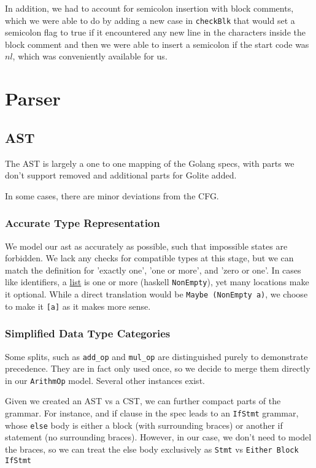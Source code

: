 \documentclass[11pt]{article}
\begin{document}
In addition, we had to account for semicolon insertion with block
comments, which we were able to do by adding a new case in
\texttt{checkBlk} that would set a semicolon flag to true if it
encountered any new line in the characters inside the block comment
and then we were able to insert a semicolon if the start code was
\(nl\), which was conveniently available for us.
\section{Parser}
\label{sec:org87a415d}
\subsection{AST}
\label{sec:org363f59b}
The AST is largely a one to one mapping of the Golang specs, with
parts we don't support removed and additional parts for Golite added.

In some cases, there are minor deviations from the CFG.
\subsubsection{Accurate Type Representation}
\label{sec:orge7fe947}
We model our ast as accurately as possible, such that impossible
states are forbidden. We lack any checks for compatible types at
this stage, but we can match the definition for 'exactly one', 'one
or more', and 'zero or one'. In cases like identifiers, a \href{https://golang.org/ref/spec\#IdentifierList}{list} is
one or more (haskell \texttt{NonEmpty}), yet many locations make it
optional. While a direct translation would be \texttt{Maybe (NonEmpty a)},
we choose to make it \texttt{[a]} as it makes more sense.
\subsubsection{Simplified Data Type Categories}
\label{sec:org1472b06}
Some splits, such as \texttt{add\_op} and \texttt{mul\_op} are distinguished
purely to demonstrate precedence. They are in fact only used once,
so we decide to merge them directly in our \texttt{ArithmOp}
model. Several other instances exist.

Given we created an AST vs a CST, we can further compact parts of
the grammar. For instance, and if clause in the spec leads to an
\texttt{IfStmt} grammar, whose \texttt{else} body is either a block (with
surrounding braces) or another if statement (no surrounding
braces). However, in our case, we don't need to model the braces,
so we can treat the else body exclusively as \texttt{Stmt} vs \texttt{Either
    Block IfStmt}
\end{document}
